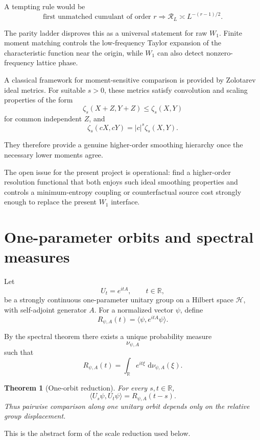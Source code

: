 \documentclass[11pt,a4paper]{article}
\newtheorem{theorem}{Theorem}[section]
\newcommand{\cH}{\mathcal H}
\newcommand{\R}{\mathbb R}
\newcommand{\1}{\mathbf 1}
\newcommand{\dd}{\,\mathrm d}
\newcommand{\ip}[2]{\langle #1,#2\rangle}
\begin{document}
A tempting rule would be
\[
\text{first unmatched cumulant of order }r
\Longrightarrow
\mathcal R_L
\asymp
L^{-(r-1)/2}.
\tag{28.1}
\]

The parity ladder disproves this as a universal statement for raw
\(W_1\).
Finite moment matching controls the low-frequency Taylor expansion of
the characteristic function near the origin, while \(W_1\) can also
detect nonzero-frequency lattice phase.

A classical framework for moment-sensitive comparison is provided by
Zolotarev ideal metrics.
For suitable \(s>0\), these metrics satisfy convolution and scaling
properties of the form
\[
\zeta_s(X+Z,Y+Z)\le\zeta_s(X,Y)
\tag{28.2}
\]
for common independent \(Z\), and
\[
\zeta_s(cX,cY)
=
|c|^s\zeta_s(X,Y).
\tag{28.3}
\]

They therefore provide a genuine higher-order smoothing hierarchy once
the necessary lower moments agree.

The open issue for the present project is operational:
find a higher-order resolution functional that both enjoys such ideal
smoothing properties and controls a minimum-entropy coupling or
counterfactual source cost strongly enough to replace the present
\(W_1\) interface.


\section{One-parameter orbits and spectral measures}

Let
\[
U_t=e^{itA},
\qquad
t\in\R,
\]
be a strongly continuous one-parameter unitary group on a Hilbert space
\(\cH\), with self-adjoint generator \(A\).
For a normalized vector \(\psi\), define
\[
\boxed{
R_{\psi,A}(t)
=
\ip{\psi}{e^{itA}\psi}.
}
\tag{29.1}
\]

By the spectral theorem there exists a unique probability measure
\[
\nu_{\psi,A}
\]
such that
\[
\boxed{
R_{\psi,A}(t)
=
\int_\R e^{it\xi}\,\dd\nu_{\psi,A}(\xi).
}
\tag{29.2}
\]

\begin{theorem}[One-orbit reduction]
For every \(s,t\in\R\),
\[
\boxed{
\ip{U_s\psi}{U_t\psi}
=
R_{\psi,A}(t-s).
}
\tag{29.3}
\]
Thus pairwise comparison along one unitary orbit depends only on the
relative group displacement.
\end{theorem}

This is the abstract form of the scale reduction used below.
\end{document}
